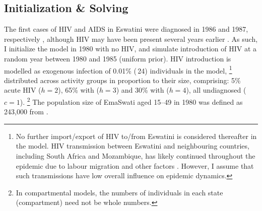 \subsection{Initialization \& Solving}\label{model.init}
The first cases of HIV and AIDS in Eswatini
were diagnosed in 1986 and 1987, respectively \cite{Whiteside2007},
although HIV may have been present several years earlier \cite{Iliffe2005}.
As such, I initialize the model in 1980 with no HIV,
and simulate introduction of HIV at a random year between 1980 and 1985 (uniform prior).
HIV introduction is modelled as
exogenous infection of 0.01\% (\ttilde\,24) individuals in the model,%
\footnote{No further import/export of HIV to/from Eswatini is considered thereafter in the model.
  HIV transmission between Eswatini and neighbouring countries,
  including South Africa and Mozambique,
  has likely continued throughout the epidemic
  due to labour migration and other factors \cite{Iliffe2005}.
  However, I assume that such transmissions have low overall influence on epidemic dynamics.}
distributed across activity groups in proportion to their size, comprising:
5\% acute HIV ($h=2$), 65\% with  ($h=3$) and 30\% with  ($h=4$),
all undiagnosed ($c=1$).%
\footnote{In compartmental models, the numbers of individuals in each state (compartment)
  need not be whole numbers.}
The population size of EmaSwati aged 15--49 in 1980
was defined as 243,000 from \cite{WorldBank}.

